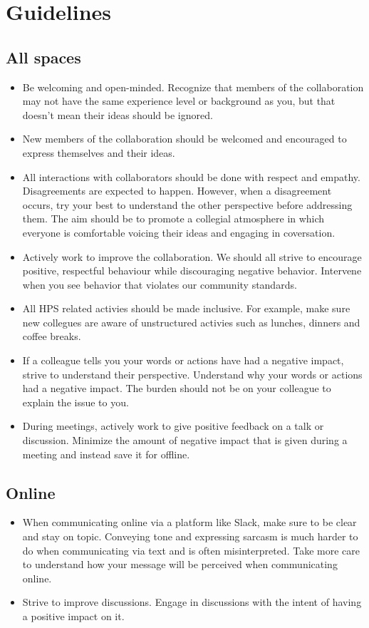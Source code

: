 \documentclass[10pt]{article}
\begin{document}
\section{Guidelines}

\subsection{All spaces}
\begin{itemize}
    \item Be welcoming and open-minded.  Recognize that members of the 
      collaboration may not have the same experience level or background as 
      you, but that doesn't mean their ideas should be ignored. 
    \item New members of the collaboration should be welcomed and encouraged 
      to express themselves and their ideas. 
    \item All interactions with collaborators should be done with respect and 
      empathy. Disagreements are expected to happen.  However, when a disagreement
      occurs, try your best to understand the other perspective before addressing 
      them.  The aim should be to promote a collegial atmosphere in which 
      everyone is comfortable voicing their ideas and engaging in coversation.
    \item Actively work to improve the collaboration. We should all strive to 
      encourage positive, respectful behaviour while discouraging negative 
      behavior. Intervene when you see behavior that violates our community 
      standards. 
    \item All HPS related activies should be made inclusive. For example, 
      make sure new collegues are aware of unstructured activies such as lunches, 
      dinners and coffee breaks.
    \item If a colleague tells you your words or actions have had a negative 
      impact, strive to understand their perspective.  Understand why your words
      or actions had a negative impact.  The burden should not be on your colleague 
      to explain the issue to you. 
    \item During meetings, actively work to give positive feedback on a talk 
      or discussion.  Minimize the amount of negative impact that is given during
      a meeting and instead save it for offline. 
\end{itemize}

\subsection{Online}
\begin{itemize}
    \item When communicating online via a platform like Slack, make sure to 
    be clear and stay on topic.  Conveying tone and expressing sarcasm is much
    harder to do when communicating via text and is often misinterpreted. Take 
    more care to understand how your message will be perceived when 
    communicating online.
    \item Strive to improve discussions.  Engage in discussions with the 
    intent of having a positive impact on it.  
\end{itemize}
\end{document}
